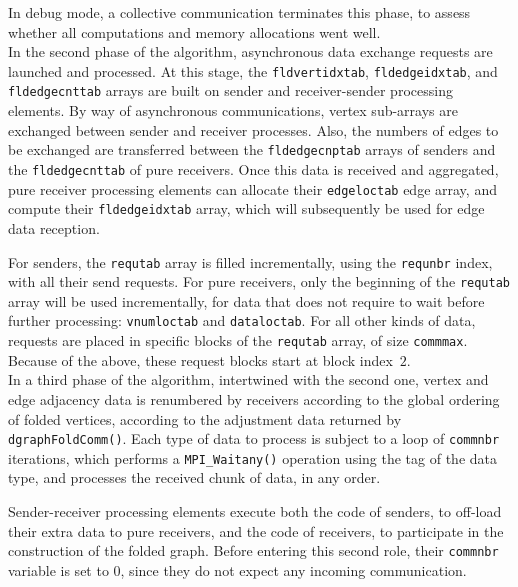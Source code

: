 In debug mode, a collective communication terminates this phase, to
assess whether all computations and memory allocations went well.
~\\

In the second phase of the algorithm, asynchronous data exchange
requests are launched and processed. At this stage, the
\texttt{fld\lbt vert\lbt idxtab}, \texttt{fld\lbt edge\lbt idxtab},
and \texttt{fld\lbt edge\lbt cnttab} arrays are built on sender and
receiver-sender processing elements. By way of asynchronous
communications, vertex sub-arrays are exchanged between sender and
receiver processes. Also, the numbers of edges to be exchanged are
transferred between the \texttt{fld\lbt edge\lbt cnptab} arrays of
senders and the \texttt{fld\lbt edge\lbt cnttab} of pure
receivers. Once this data is received and aggregated, pure receiver
processing elements can allocate their \texttt{edge\lbt loc\lbt tab}
edge array, and compute their \texttt{fld\lbt edge\lbt idxtab} array,
which will subsequently be used for edge data reception.

For senders, the \texttt{requtab} array is filled incrementally, using
the \texttt{requnbr} index, with all their send requests. For pure
receivers, only the beginning of the \texttt{requtab} array will be
used incrementally, for data that does not require to wait before
further processing: \texttt{vnumloctab} and
\texttt{data\lbt loctab}. For all other kinds of data, requests are
placed in specific blocks of the \texttt{requtab} array, of size
\texttt{commmax}. Because of the above, these request blocks start at
block index~$2$.
\\

In a third phase of the algorithm, intertwined with the second one,
vertex and edge adjacency data is renumbered by receivers according to
the global ordering of folded vertices, according to the adjustment
data returned by \texttt{dgraph\lbt Fold\lbt Comm()}. Each type of
data to process is subject to a loop of \texttt{commnbr} iterations,
which performs a \texttt{MPI\_\lbt Waitany()} operation using the tag
of the data type, and processes the received chunk of data, in any
order.

Sender-receiver processing elements execute both the code of senders,
to off-load their extra data to pure receivers, and the code of
receivers, to participate in the construction of the folded
graph. Before entering this second role, their \texttt{commnbr}
variable is set to $0$, since they do not expect any incoming
communication.
\\


